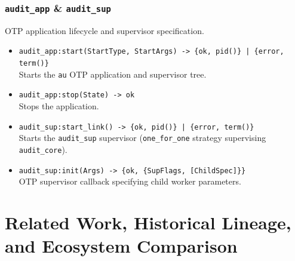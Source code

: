 \documentclass{article}
\begin{document}
\subsubsection{\texttt{audit\_app} \& \texttt{audit\_sup}}
OTP application lifecycle and supervisor specification.
\begin{itemize}
    \item \texttt{audit\_app:start(StartType, StartArgs) -> \{ok, pid()\} | \{error, term()\}} \\
    Starts the \texttt{au} OTP application and supervisor tree.
    \item \texttt{audit\_app:stop(State) -> ok} \\
    Stops the application.
    \item \texttt{audit\_sup:start\_link() -> \{ok, pid()\} | \{error, term()\}} \\
    Starts the \texttt{audit\_sup} supervisor (\texttt{one\_for\_one} strategy supervising \texttt{audit\_core}).
    \item \texttt{audit\_sup:init(Args) -> \{ok, \{SupFlags, [ChildSpec]\}\}} \\
    OTP supervisor callback specifying child worker parameters.
\end{itemize}

\section{Related Work, Historical Lineage, and Ecosystem Comparison}
\end{document}
